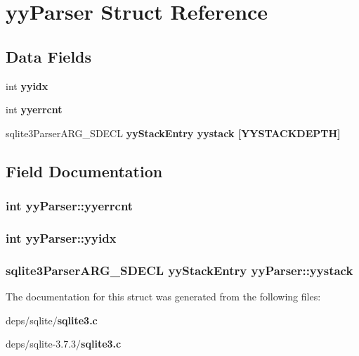 \section{yy\-Parser Struct Reference}
\label{structyyParser}
\subsection*{Data Fields}
\begin{CompactItemize}
\item 
int \bf{yyidx}
\item 
int \bf{yyerrcnt}
\item 
sqlite3Parser\-ARG\_\-SDECL \bf{yy\-Stack\-Entry} \bf{yystack} [YYSTACKDEPTH]
\end{CompactItemize}


\subsection{Field Documentation}
\subsubsection{\setlength{\rightskip}{0pt plus 5cm}int \bf{yy\-Parser::yyerrcnt}}\label{structyyParser_e14327c09f9541eabbb4c6b5ff615164}


\subsubsection{\setlength{\rightskip}{0pt plus 5cm}int \bf{yy\-Parser::yyidx}}\label{structyyParser_8e3a54f1cb922a1aa23ea6cf9660219a}


\subsubsection{\setlength{\rightskip}{0pt plus 5cm}sqlite3Parser\-ARG\_\-SDECL \bf{yy\-Stack\-Entry} \bf{yy\-Parser::yystack}}\label{structyyParser_b764c15a9feea0da161dfbcbd8b2676a}




The documentation for this struct was generated from the following files:\begin{CompactItemize}
\item 
deps/sqlite/\bf{sqlite3.c}\item 
deps/sqlite-3.7.3/\bf{sqlite3.c}\end{CompactItemize}
